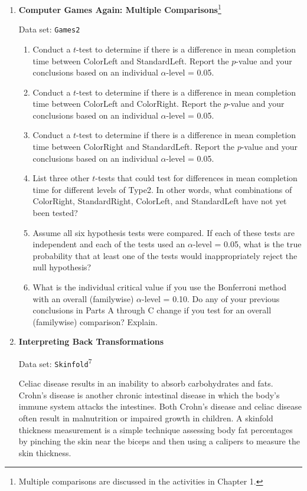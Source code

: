 \documentclass[
]{report}
\begin{document}
\begin{enumerate}
  \item \textbf{Computer Games Again: Multiple Comparisons}\footnote{Multiple comparisons are discussed in the activities in Chapter 1.}

Data set: \texttt{Games2}

  \begin{enumerate}
    \item Conduct a $\scriptstyle t$-test to determine if there is a difference in mean completion time between ColorLeft and StandardLeft. Report the $\scriptstyle p$-value and your conclusions based on an individual $\scriptstyle \alpha$-level = 0.05.
      \item Conduct a $\scriptstyle t$-test to determine if there is a difference in mean completion time between ColorLeft and ColorRight. Report the $\scriptstyle p$-value and your conclusions based on an individual $\scriptstyle \alpha$-level = 0.05.
      \item Conduct a $\scriptstyle t$-test to determine if there is a difference in mean completion time between ColorRight and StandardLeft. Report the $\scriptstyle p$-value and your conclusions based on an individual $\scriptstyle \alpha$-level = 0.05.
      \item List three other $\scriptstyle t$-tests that could test for differences in mean completion time for different levels of Type2. In other words, what combinations of ColorRight, StandardRight, ColorLeft, and StandardLeft have not yet been tested?
      \item Assume all six hypothesis tests were compared. If each of these tests are independent and each of the tests used an $\scriptstyle \alpha$-level = 0.05, what is the true probability that at least one of the tests would inappropriately reject the null hypothesis?
      \item What is the individual critical value if you use the Bonferroni method with an overall (familywise) $\scriptstyle \alpha$-level = 0.10. Do any of your previous conclusions in Parts A through C change if you test for an overall (familywise) comparison? Explain.
    \end{enumerate}

  \item \textbf{Interpreting Back Transformations}

Data set: \texttt{Skinfold}\textsuperscript{7}

Celiac disease results in an inability to absorb carbohydrates and fats. Crohn’s disease is another chronic intestinal disease in which the body’s immune system attacks the intestines. Both Crohn’s disease and celiac disease often result in malnutrition or impaired growth in children. A skinfold thickness measurement is a simple technique assessing body fat percentages by pinching the skin near the biceps and then using a calipers to measure the skin thickness.


\end{enumerate}
\end{document}
